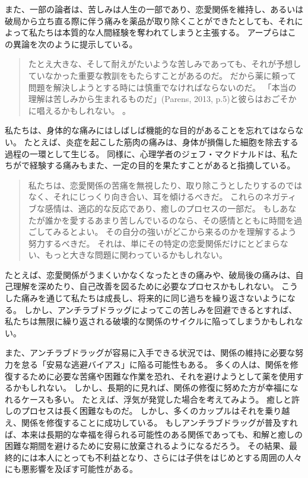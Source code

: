 \documentclass[paper=a4,book,openany]{jlreq}
\newcommand{\ig}[1]{}           %
\begin{document}
また、一部の論者は、苦しみは人生の一部であり、恋愛関係を維持し、あるいは破局から立ち直る際に伴う痛みを薬品が取り除くことができたとしても、それによって私たちは本質的な人間経験を奪われてしまうと主張する。
アープらはこの異論を次のように提示している。

\begin{quote}
たとえ大きな、そして耐えがたいような苦しみであっても、それが予想していなかった重要な教訓をもたらすことがあるのだ。
だから薬に頼って問題を解決しようとする時には慎重でなければならないのだ。
「本当の理解は苦しみから生まれるものだ」(Parens, 2013, p.5)\ig{Parens}と彼らはおごそかに唱えるかもしれない。
\citep[p.12]{earp13:_if_i_could_just_stop_lovin_you}\nocite{parens13:_good_bad_forms_medic}。
\end{quote}

私たちは、身体的な痛みにはしばしば機能的な目的があることを忘れてはならない。
たとえば、炎症を起こした筋肉の痛みは、身体が損傷した細胞を除去する過程の一環として生じる。
同様に、心理学者のジェフ・マクドナルド\ig{(Geoff MacDonald)}は、私たちがで経験する痛みもまた、一定の目的を果たすことがあると指摘している。

\begin{quote}
私たちは、恋愛関係の苦痛を無視したり、取り除こうとしたりするのではなく、それにじっくり向き合い、耳を傾けるべきだ。
これらのネガティブな感情は、適応的な反応であり、癒しのプロセスの一部だ。
もしあなたが誰かを愛するあまり苦しんでいるのなら、その感情とともに時間を過ごしてみるとよい。
その自分の強いがどこから来るのかを理解するよう努力するべきだ。
それは、単にその特定の恋愛関係だけにとどまらない、もっと大きな問題に関わっているかもしれない。
\citep{lawson17:_why_does_love_hurt_so_much}
\end{quote}

たとえば、恋愛関係がうまくいかなくなったときの痛みや、破局後の痛みは、自己理解を深めたり、自己改善を図るために必要なプロセスかもしれない。
こうした痛みを通じて私たちは成長し、将来的に同じ過ちを繰り返さないようになる。
しかし、アンチラブドラッグによってこの苦しみを回避できるとすれば、私たちは無限に繰り返される破壊的な関係のサイクルに陥ってしまうかもしれない。

また、アンチラブドラッグが容易に入手できる状況では、関係の維持に必要な努力を怠る「安易な逃避バイアス」に陥る可能性もある。
多くの人は、関係を修復するために必要な苦痛や困難な作業を恐れ、それを避けようとして薬を使用するかもしれない。
しかし、長期的に見れば、関係の修復に努めた方が幸福になれるケースも多い。
たとえば、浮気が発覚した場合を考えてみよう。
癒しと許しのプロセスは長く困難なものだ。
しかし、多くのカップルはそれを乗り越え、関係を修復することに成功している。
もしアンチラブドラッグが普及すれば、本来は長期的な幸福を得られる可能性のある関係であっても、和解と癒しの困難な期間を避けるために安易に放棄されるようになるだろう。
その結果、最終的には本人にとっても不利益となり、さらには子供をはじめとする周囲の人々にも悪影響を及ぼす可能性がある。
\end{document}
